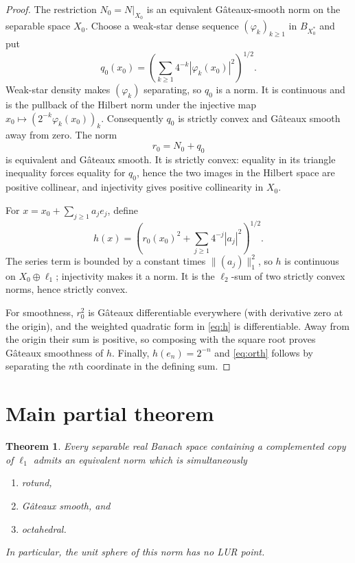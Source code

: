 \documentclass[11pt]{article}
\newtheorem{theorem}{Theorem}
\begin{document}
\begin{proof}
The restriction $N_0=N|_{X_0}$ is an equivalent G\^ateaux-smooth norm on the
separable space $X_0$.  Choose a weak-star dense sequence
$(\varphi_k)_{k\ge1}$ in $B_{X_0^*}$ and put
\[
 q_0(x_0)=\left(\sum_{k\ge1}4^{-k}|\varphi_k(x_0)|^2\right)^{1/2}.
\]
Weak-star density makes $(\varphi_k)$ separating, so $q_0$ is a norm.  It is
continuous and is the pullback of the Hilbert norm under the injective map
$x_0\mapsto(2^{-k}\varphi_k(x_0))_k$.  Consequently $q_0$ is strictly convex
and G\^ateaux smooth away from zero.  The norm
\[
                         r_0=N_0+q_0
\]
is equivalent and G\^ateaux smooth.  It is strictly convex: equality in its
triangle inequality forces equality for $q_0$, hence the two images in the
Hilbert space are positive collinear, and injectivity gives positive
collinearity in $X_0$.

For $x=x_0+\sum_{j\ge1}a_je_j$, define
\begin{equation}\label{eq:h}
 h(x)=\left(r_0(x_0)^2+\sum_{j\ge1}4^{-j}|a_j|^2\right)^{1/2}.
\end{equation}
The series term is bounded by a constant times $\|(a_j)\|_1^2$, so $h$ is
continuous on $X_0\oplus\ell_1$; injectivity makes it a norm.  It is the
$\ell_2$-sum of two strictly convex norms, hence strictly convex.

For smoothness, $r_0^2$ is G\^ateaux differentiable everywhere (with
derivative zero at the origin), and the weighted quadratic form in
\eqref{eq:h} is differentiable.  Away from the origin their sum is positive,
so composing with the square root proves G\^ateaux smoothness of $h$.
Finally, $h(e_n)=2^{-n}$ and \eqref{eq:orth} follows by separating the
$n$th coordinate in the defining sum.
\end{proof}

\section{Main partial theorem}

\begin{theorem}\label{thm:main}
Every separable real Banach space containing a complemented copy of $\ell_1$
admits an equivalent norm which is simultaneously
\begin{enumerate}
\item rotund,
\item G\^ateaux smooth, and
\item octahedral.
\end{enumerate}
In particular, the unit sphere of this norm has no LUR point.
\end{theorem}
\end{document}
